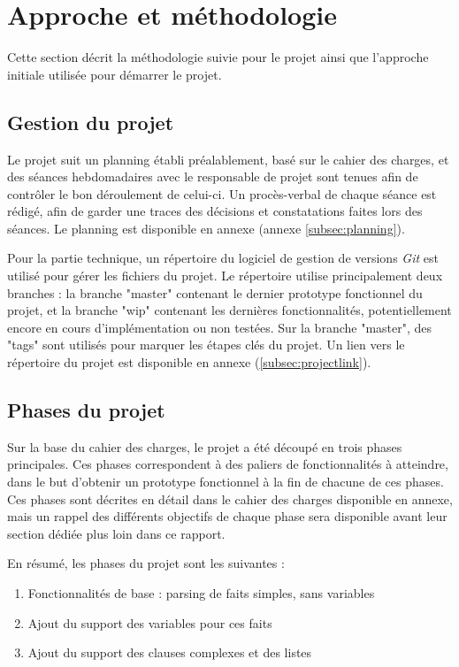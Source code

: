 \documentclass[../report.tex]{subfiles}
\begin{document}
\section{Approche et méthodologie}
Cette section décrit la méthodologie suivie pour le projet ainsi que l'approche initiale utilisée pour démarrer le projet.
\subsection{Gestion du projet}
Le projet suit un planning établi préalablement, basé sur le cahier des charges, et des séances hebdomadaires avec le responsable de projet sont tenues afin de contrôler le bon déroulement de celui-ci. Un procès-verbal de chaque séance est rédigé, afin de garder une traces des décisions et constatations faites lors des séances. Le planning est disponible en annexe (annexe \ref{subsec:planning}).

Pour la partie technique, un répertoire du logiciel de gestion de versions \textit{Git} est utilisé pour gérer les fichiers du projet. Le répertoire utilise principalement deux branches : la branche "master" contenant le dernier prototype fonctionnel du projet, et la branche "wip" contenant les dernières fonctionnalités, potentiellement encore en cours d'implémentation ou non testées. Sur la branche "master", des "tags" sont utilisés pour marquer les étapes clés du projet. Un lien vers le répertoire du projet est disponible en annexe (\ref{subsec:projectlink}).
\subsection{Phases du projet}\label{subsec:projectPhases}
Sur la base du cahier des charges, le projet a été découpé en trois phases principales. Ces phases correspondent à des paliers de fonctionnalités à atteindre, dans le but d'obtenir un prototype fonctionnel à la fin de chacune de ces phases. Ces phases sont décrites en détail dans le cahier des charges disponible en annexe, mais un rappel des différents objectifs de chaque phase sera disponible avant leur section dédiée plus loin dans ce rapport.

En résumé, les phases du projet sont les suivantes :
\begin{enumerate}
    \item Fonctionnalités de base : parsing de faits simples, sans variables
    \item Ajout du support des variables pour ces faits
    \item Ajout du support des clauses complexes et des listes
\end{enumerate}
\end{document}
